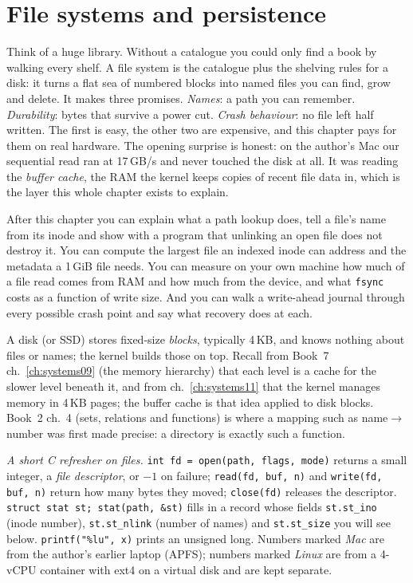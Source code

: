 \chapter{File systems and persistence}
\label{ch:systems14}

Think of a huge library. Without a catalogue you could only find a
book by walking every shelf. A file system is the catalogue plus the
shelving rules for a disk: it turns a flat sea of numbered blocks into
named files you can find, grow and delete. It makes three promises.
\emph{Names}: a path you can remember. \emph{Durability}: bytes that
survive a power cut. \emph{Crash behaviour}: no file left half
written. The first is easy, the other two are expensive, and this
chapter pays for them on real hardware. The opening surprise is
honest: on the author's Mac our sequential read ran at 17\,GB/s and
never touched the disk at all. It was reading the \emph{buffer
cache}, the RAM the kernel keeps copies of recent file data in, which
is the layer this whole chapter exists to explain.

\begin{wins}
After this chapter you can explain what a path lookup does, tell a
file's name from its inode and show with a program that unlinking an
open file does not destroy it. You can compute the largest file an
indexed inode can address and the metadata a 1\,GiB file needs. You
can measure on your own machine how much of a file read comes from RAM
and how much from the device, and what \texttt{fsync} costs as a
function of write size. And you can walk a write-ahead journal through
every possible crash point and say what recovery does at each.
\end{wins}

\begin{rulebox}
A disk (or SSD) stores fixed-size \emph{blocks}, typically 4\,KB, and
knows nothing about files or names; the kernel builds those on top.
Recall from Book~7 ch.~\ref{ch:systems09} (the memory hierarchy) that
each level is a cache for the slower level beneath it, and from
ch.~\ref{ch:systems11} that the kernel manages memory in 4\,KB pages;
the buffer cache is that idea applied to disk blocks. Book~2 ch.~4
(sets, relations and functions) is where a mapping such as
name$\to$number was first made precise: a directory is exactly such a
function.

\emph{A short C refresher on files.} \texttt{int fd = open(path,
flags, mode)} returns a small integer, a \emph{file descriptor}, or
$-1$ on failure; \texttt{read(fd, buf, n)} and \texttt{write(fd, buf,
n)} return how many bytes they moved; \texttt{close(fd)} releases
the descriptor. \texttt{struct stat st; stat(path, \&st)} fills in a
record whose fields \texttt{st.st\_ino} (inode number),
\texttt{st.st\_nlink} (number of names) and \texttt{st.st\_size} you
will see below. \texttt{printf("\%lu", x)} prints an unsigned long.
Numbers marked \emph{Mac} are from the author's earlier laptop
(APFS); numbers marked \emph{Linux} are from a 4-vCPU container with
ext4 on a virtual disk and are kept separate.
\end{rulebox}

